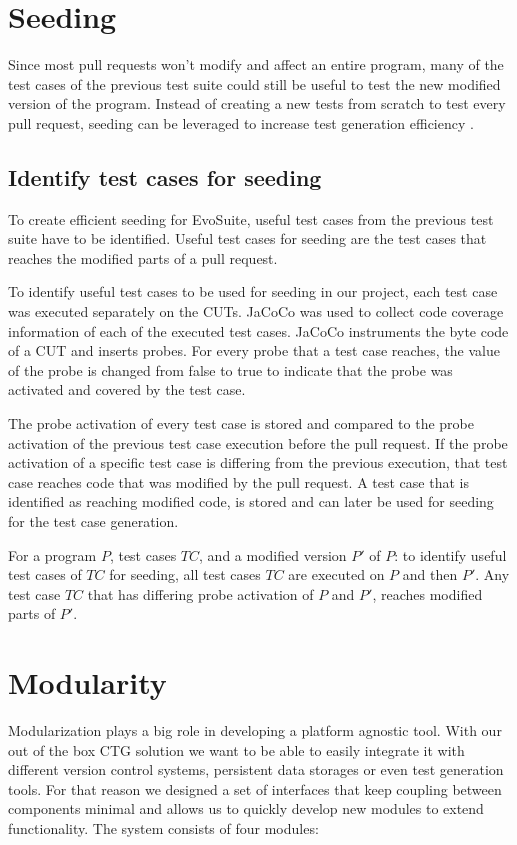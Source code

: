 \documentclass[12pt, a4paper]{article}
\begin{document}
\section{Seeding}
Since most pull requests won’t modify and affect an entire program, many of the test cases of the previous test suite could still be useful to test the new modified version of the program. Instead of creating a new tests from scratch to test every pull request, seeding can be leveraged to increase test generation efficiency \cite{campos_continuous_2014}.



\subsection{Identify test cases for seeding}
To create efficient seeding for EvoSuite, useful test cases from the previous test suite have to be identified. Useful test cases for seeding are the test cases that reaches the modified parts of a pull request.

To identify useful test cases to be used for seeding in our project, each test case was executed separately on the CUTs. JaCoCo was used to collect code coverage information of each of the executed test cases. JaCoCo instruments the byte code of a CUT and inserts probes. For every probe that a test case reaches, the value of the probe is changed from false to true to indicate that the probe was activated and covered by the test case.

The probe activation of every test case is stored and compared to the probe activation of the previous test case execution before the pull request. If the probe activation of a specific test case is differing from the previous execution, that test case reaches code that was modified by the pull request. A test case that is identified as reaching modified code, is stored and can later be used for seeding for the test case generation. 

For a program $P$, test cases $TC$, and a modified version $P'$ of $P$: to identify useful test cases of $TC$ for seeding, all test cases $TC$ are executed on $P$ and then $P'$. Any test case $TC$ that has differing probe activation of $P$ and $P'$, reaches modified parts of $P'$.

\section{Modularity}
Modularization plays a big role in developing a platform agnostic tool. With our out of the box CTG solution we want to be able to easily integrate it with different version control systems, persistent data storages or even test generation tools. For that reason we designed a set of interfaces that keep coupling between components minimal and allows us to quickly develop new modules to extend functionality. The system consists of four modules:
\end{document}
